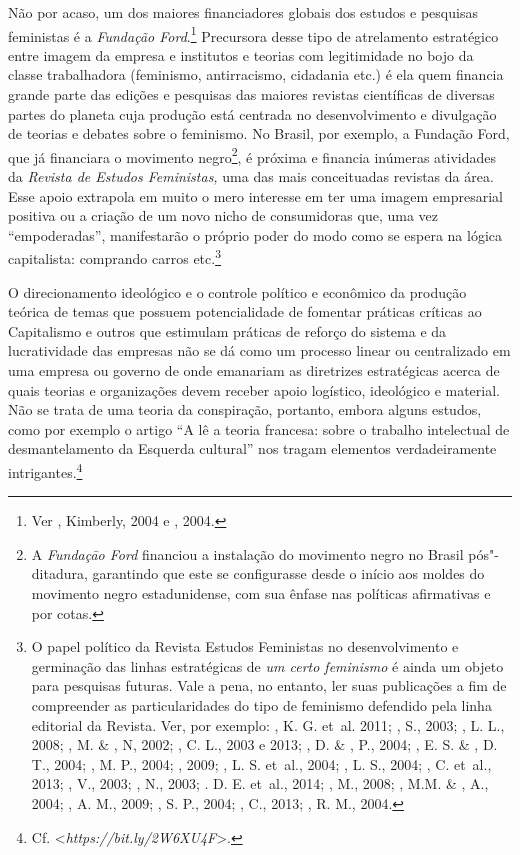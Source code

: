 Não por acaso, um dos maiores financiadores globais dos estudos e
pesquisas feministas é a \emph{Fundação Ford}.\footnote{Ver ,
  Kimberly, 2004 e , 2004.} Precursora desse tipo de atrelamento
estratégico entre imagem da empresa e institutos e teorias com
legitimidade no bojo da classe trabalhadora (feminismo, antirracismo,
cidadania etc.) é ela quem financia grande parte das edições e pesquisas
das maiores revistas científicas de diversas partes do planeta cuja
produção está centrada no desenvolvimento e divulgação de teorias e
debates sobre o feminismo. No Brasil, por exemplo, a Fundação Ford, que
já financiara o movimento negro\footnote{A \emph{Fundaçāo Ford}
  financiou a instalação do movimento negro no Brasil pós"-ditadura,
  garantindo que este se configurasse desde o início aos moldes do
  movimento negro estadunidense, com sua ênfase nas políticas
  afirmativas e por cotas.}, é próxima e financia inúmeras atividades da
\emph{Revista de Estudos Feministas,} uma das mais conceituadas revistas
da área. Esse apoio extrapola em muito o mero interesse em ter uma
imagem empresarial positiva ou a criação de um novo nicho de
consumidoras que, uma vez ``empoderadas'', manifestarão o próprio poder
do modo como se espera na lógica capitalista: comprando carros
etc.\footnote{O papel político da Revista Estudos Feministas no
  desenvolvimento e germinação das linhas estratégicas de \emph{um certo
  feminismo} é ainda um objeto para pesquisas futuras. Vale a pena, no
  entanto, ler suas publicações a fim de compreender as particularidades
  do tipo de feminismo defendido pela linha editorial da Revista. Ver,
  por exemplo: , K. G. et~al. 2011; , S., 2003; ,
  L. L., 2008; , M. \& , N, 2002; , C. L., 2003 e
  2013; , D. \& , P., 2004; , E. S. \& , D.
  T., 2004; , M. P., 2004; , 2009; , L. S. et~al.,
  2004; , L. S., 2004; , C. et~al., 2013; , V.,
  2003; , N., 2003; . D. E. et~al., 2014; , M., 2008;
  , M.M. \& , A., 2004; , A. M., 2009; , S.
  P., 2004; , C., 2013; , R. M., 2004.}

O direcionamento ideológico e o controle político e econômico da
produção teórica de temas que possuem potencialidade de fomentar
práticas críticas ao Capitalismo e outros que estimulam práticas de
reforço do sistema e da lucratividade das empresas não se dá como um
processo linear ou centralizado em uma empresa ou governo de onde
emanariam as diretrizes estratégicas acerca de quais teorias e
organizações devem receber apoio logístico, ideológico e material. Não
se trata de uma teoria da conspiração, portanto, embora alguns estudos,
como por exemplo o artigo ``A  lê a teoria francesa: sobre o trabalho
intelectual de desmantelamento da Esquerda cultural'' nos tragam
elementos verdadeiramente intrigantes.\footnote{Cf.
  \textless{}\emph{https://bit.ly/2W6XU4F}\textgreater{}.}

